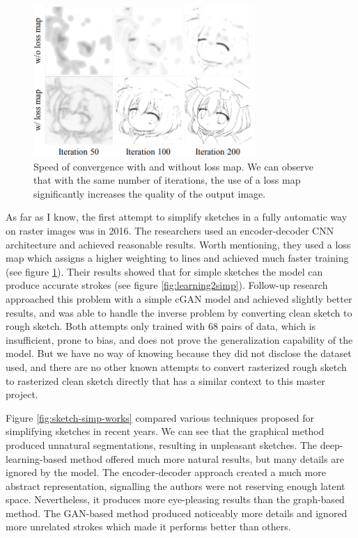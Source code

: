 \begin{figure}
    \centering
    \includegraphics[width=0.75\textwidth]{images/sketch/loss-map-compare.png}
    \caption[Speed of convergence with and without loss map.]{Speed of convergence with and without loss map. We can observe that with the same number of iterations, the use of a loss map significantly increases the quality of the output image.\cite{simo-serraMasteringSketchingAdversarial2017}} 
    \label{fig:loss-map-compare}
\end{figure}

As far as I know, the first attempt to simplify sketches in a fully automatic way on raster images was in 2016\cite{simo-serraLearningSimplifyFully2016}. The researchers used an encoder-decoder CNN architecture and achieved reasonable results. Worth mentioning, they used a loss map which assigns a higher weighting to lines and achieved much faster training (see figure \ref{fig:loss-map-compare}). Their results showed that for simple sketches the model can produce accurate strokes (see figure \ref{fig:learning2simp}). Follow-up research approached this problem with a simple cGAN model and achieved slightly better results\cite{simo-serraMasteringSketchingAdversarial2017}, and was able to handle the inverse problem by converting clean sketch to rough sketch. Both attempts only trained with 68 pairs of data, which is insufficient, prone to bias, and does not prove the generalization capability of the model. But we have no way of knowing because they did not disclose the dataset used, and there are no other known attempts  to convert rasterized rough sketch to rasterized clean sketch directly that has a similar context to this master project.

Figure \ref{fig:sketch-simp-works} compared various techniques proposed for simplifying sketches in recent years. We can see that the graphical method produced unnatural segmentations, resulting in unpleasant sketches. The deep-learning-based method offered much more natural results, but many details are ignored by the model. The encoder-decoder approach created a much more abstract representation, signalling the authors were not reserving enough latent space. Nevertheless, it produces more eye-pleasing results than the graph-based method. The GAN-based method produced noticeably more details and ignored more unrelated strokes which made it performs better than others.

